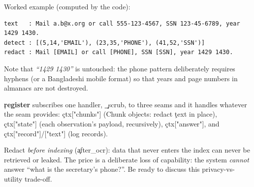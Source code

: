 Worked example (computed by the code):
\begin{lstlisting}[style=plain]
text   : Mail a.b@x.org or call 555-123-4567, SSN 123-45-6789, year 1429 1430.
detect : [(5,14,'EMAIL'), (23,35,'PHONE'), (41,52,'SSN')]
redact : Mail [EMAIL] or call [PHONE], SSN [SSN], year 1429 1430.
\end{lstlisting}
Note that \emph{``1429 1430''} is untouched: the phone pattern deliberately requires hyphens (or a Bangladeshi mobile format) so that years and page numbers in almanacs are not destroyed.

\textbf{\c{register}} subscribes one handler, \c{\_scrub}, to three seams and it handles whatever the seam provides: \c{ctx["chunks"]} (Chunk objects: redact \c{text} in place), \c{ctx["state"]} (each observation's payload, recursively), \c{ctx["answer"]}, and \c{ctx["record"]/["text"]} (log records).
\begin{why}
Redact \emph{before indexing} (\c{after\_ocr}): data that never enters the index can never be retrieved or leaked. The price is a deliberate loss of capability: the system \emph{cannot} answer ``what is the secretary's phone?''. Be ready to discuss this privacy-vs-utility trade-off.
\end{why}
